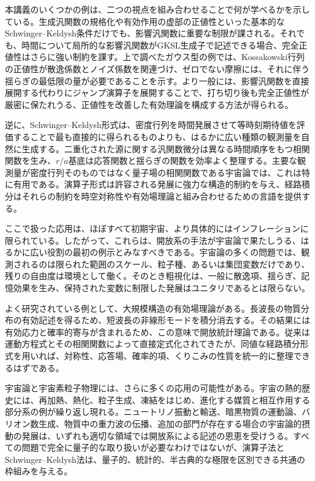 \documentclass[a4paper,11pt,oneside]{article}
\theoremstyle{definition}
\numberwithin{equation}{section}
\begin{document}
本講義のいくつかの例は、二つの視点を組み合わせることで何が学べるかを示している。生成汎関数の規格化や有効作用の虚部の正値性といった基本的なSchwinger--Keldysh条件だけでも、影響汎関数に重要な制限が課される。それでも、時間について局所的な影響汎関数がGKSL生成子で記述できる場合、完全正値性はさらに強い制約を課す。上で調べたガウス型の例では、Kossakowski行列の正値性が散逸係数とノイズ係数を関連づけ、ゼロでない摩擦には、それに伴う揺らぎの最低限の量が必要であることを示す。より一般には、影響汎関数を直接展開する代わりにジャンプ演算子を展開することで、打ち切り後も完全正値性が厳密に保たれうる、正値性を改善した有効理論を構成する方法が得られる。



逆に、Schwinger--Keldysh形式は、密度行列を時間発展させて等時刻期待値を評価することで最も直接的に得られるものよりも、はるかに広い種類の観測量を自然に生成する。二重化された源に関する汎関数微分は異なる時間順序をもつ相関関数を生み、$r/a$基底は応答関数と揺らぎの関数を効率よく整理する。主要な観測量が密度行列そのものではなく量子場の相関関数である宇宙論では、これは特に有用である。演算子形式は許容される発展に強力な構造的制約を与え、経路積分はそれらの制約を時空対称性や有効場理論と組み合わせるための言語を提供する。



ここで扱った応用は、ほぼすべて初期宇宙、より具体的にはインフレーションに限られている。したがって、これらは、開放系の手法が宇宙論で果たしうる、はるかに広い役割の最初の例示とみなすべきである。宇宙論の多くの問題では、観測されるのは限られた範囲のスケール、粒子種、あるいは集団変数だけであり、残りの自由度は環境として働く。そのとき粗視化は、一般に散逸項、揺らぎ、記憶効果を生み、保持された変数に制限した発展はユニタリであるとは限らない。



よく研究されている例として、大規模構造の有効場理論がある。長波長の物質分布の有効記述を得るため、短波長の非線形モードを積分消去する。その結果には有効応力と確率的寄与が含まれるため、この意味で開放統計理論である。従来は運動方程式とその相関関数によって直接定式化されてきたが、同値な経路積分形式を用いれば、対称性、応答場、確率的項、くりこみの性質を統一的に整理できるはずである。



宇宙論と宇宙素粒子物理には、さらに多くの応用の可能性がある。宇宙の熱的歴史には、再加熱、熱化、粒子生成、凍結をはじめ、進化する媒質と相互作用する部分系の例が繰り返し現れる。ニュートリノ振動と輸送、暗黒物質の運動論、バリオン数生成、物質中の重力波の伝播、追加の部門が存在する場合の宇宙論的摂動の発展は、いずれも適切な領域では開放系による記述の恩恵を受けうる。すべての問題で完全に量子的な取り扱いが必要なわけではないが、演算子法とSchwinger--Keldysh法は、量子的、統計的、半古典的な極限を区別できる共通の枠組みを与える。
\end{document}
